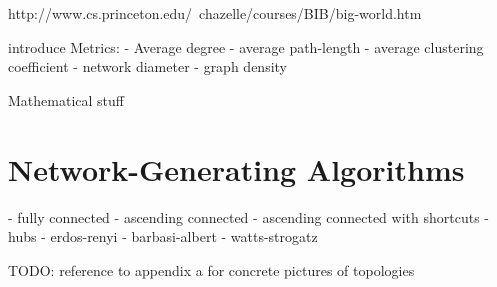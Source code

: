 \documentclass[../Bachelorarbeit.tex]{subfiles}
\begin{document}
\citep {Kleinfeld_BigWorld}
http://www.cs.princeton.edu/~chazelle/courses/BIB/big-world.htm

introduce Metrics:
- Average degree
- average path-length
- average clustering coefficient
- network diameter
- graph density

Mathematical stuff 
\citep{Newman_Eigenvectors}
\citep{AielloChungLu_RandomEvolution}
\citep{EbelMielschBornholdt_TopologyEmail}
\citep{GaertlerPatrignani_AutonomousSystem}

\section{Network-Generating Algorithms}
- fully connected
- ascending connected
- ascending connected with shortcuts
- hubs
- erdos-renyi
- barbasi-albert
- watts-strogatz

TODO: reference to appendix a for concrete pictures of topologies
\end{document}
